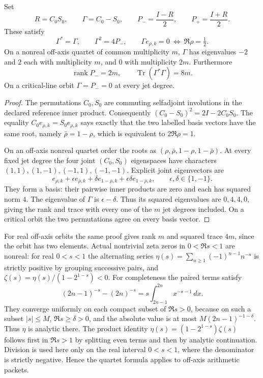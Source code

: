 \begin{theorem}
\label{thm:historical-ghost}
Set
\[
 R=C_0S_0,\qquad \Gamma=C_0-S_0,\qquad
 P_-=\frac{I-R}{2},\qquad P_+=\frac{I+R}{2}.
\]
These satisfy
\[
 \Gamma^*=\Gamma,\qquad \Gamma^2=4P_-,\qquad
 \Gamma e_{\rho,k}=0\ \Longleftrightarrow\ \Re\rho=\tfrac12.
\]
On a nonreal off-axis quartet of common multiplicity $m$, $\Gamma$ has
eigenvalues $-2$ and $2$ each with multiplicity $m$, and $0$ with
multiplicity $2m$.  Furthermore
\[
 \operatorname{rank}P_-=2m,\qquad
 \operatorname{Tr}(\Gamma^*\Gamma)=8m.
\]
On a critical-line orbit $\Gamma=P_-=0$ at every jet degree.
\end{theorem}
\begin{proof}
The permutations $C_0,S_0$ are commuting selfadjoint involutions in the
declared reference inner product.  Consequently
$(C_0-S_0)^2=2I-2C_0S_0$.  The equality
$C_0e_{\rho,k}=S_0e_{\rho,k}$ says exactly that the two labelled basis
vectors have the same root, namely $\bar\rho=1-\rho$, which is equivalent
to $2\Re\rho=1$.

On an off-axis nonreal quartet order the roots as
$(\rho,\bar\rho,1-\rho,1-\bar\rho)$.  At every fixed jet degree the
four joint $(C_0,S_0)$ eigenspaces have characters
$(1,1),(1,-1),(-1,1),(-1,-1)$.  Explicit joint eigenvectors are
\[
 e_{\rho,k}+\epsilon e_{\bar\rho,k}
       +\delta e_{1-\rho,k}+\epsilon\delta e_{1-\bar\rho,k},
 \qquad \epsilon,\delta\in\{1,-1\}.
\]
They form a basis: their pairwise inner products are zero and each has
squared norm $4$.  The eigenvalue of $\Gamma$ is $\epsilon-\delta$.
Thus its squared eigenvalues are $0,4,4,0$, giving the rank and trace
with every one of the $m$ jet degrees included.  On a critical orbit the
two permutations agree on every basis vector.
\end{proof}

For real off-axis orbits the same proof gives rank $m$ and squared trace
$4m$, since the orbit has two elements.  Actual nontrivial zeta zeros
in $0<\Re s<1$ are nonreal: for real $0<s<1$ the alternating series
$\eta(s)=\sum_{n\geq1}(-1)^{n-1}n^{-s}$ is strictly positive by grouping
successive pairs, and
$\zeta(s)=\eta(s)/(1-2^{1-s})<0$.  For completeness the paired terms satisfy
\[
 (2n-1)^{-s}-(2n)^{-s}
       =s\int_{2n-1}^{2n}x^{-s-1}\,dx.
\]
They converge uniformly on each compact subset of $\Re s>0$, because
on such a subset $|s|\leq M$, $\Re s\geq\delta>0$, and the absolute
value is at most $M(2n-1)^{-1-\delta}$.  Thus $\eta$ is analytic there.
The product identity $\eta(s)=(1-2^{1-s})\zeta(s)$ follows first in
$\Re s>1$ by splitting even terms and then by analytic continuation.
Division is used here only on the real interval $0<s<1$, where the
denominator is strictly negative.
Hence the quartet formula applies to off-axis arithmetic packets.


